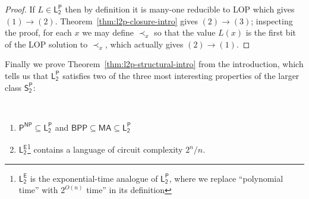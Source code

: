 \documentclass[11pt]{article}
\newtheorem*{theorem*}{Theorem}
\newtheorem{lemma}{Lemma}
\newcommand{\todo}[1]{\textcolor{red}{TODO: #1}}
\begin{document}
\begin{proof}
If $L \in \mathsf{L_2^P}$ then by definition it is many-one reducible to LOP which gives $(1)\rightarrow(2)$. Theorem~\ref{thm:l2p-closure-intro} gives $(2)\rightarrow(3)$; inspecting the proof, for each $x$ we may define $\prec_x$ so that the value $L(x)$ is the first bit of the LOP solution to $\prec_x$, which actually gives $(2)\rightarrow(1)$.
\end{proof}

Finally we prove Theorem~\ref{thm:l2p-structural-intro} from the introduction, which tells us that $\mathsf{L_2^P}$ satisfies two of the three most interesting properties of the larger class $\mathsf{S_2^P}$:


\medskip

{\it \phantom\\
\begin{enumerate}
    \item $\mathsf{P^{NP}} \subseteq \mathsf{L_2^P}$ and $\mathsf{BPP} \subseteq \mathsf{MA} \subseteq \mathsf{L_2^P}$
    \item $\mathsf{L_2^E}$\footnote{$\mathsf{L_2^E}$ is the exponential-time analogue of $\mathsf{L_2^P}$, where we replace ``polynomial time'' with $2^{O(n)}$ time'' in its definition} contains a language of circuit complexity $2^n/n$.
\end{enumerate}
}
\end{document}
